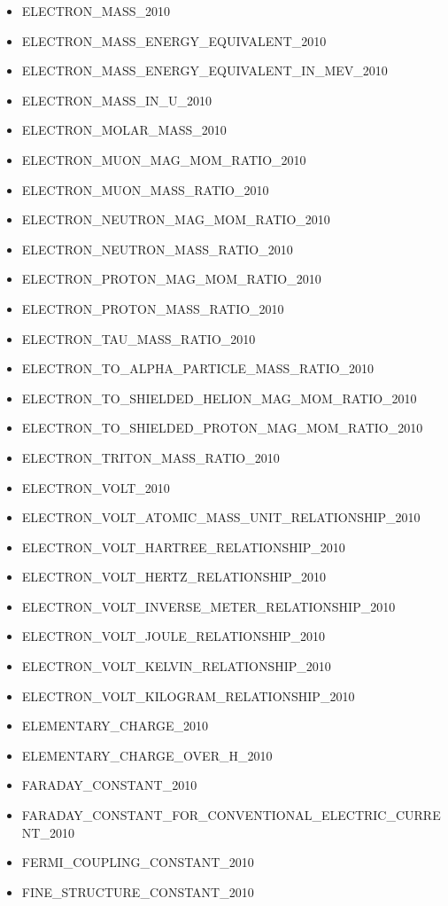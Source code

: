 \begin{itemize}
\item
  ELECTRON\_MASS\_2010
\item
  ELECTRON\_MASS\_ENERGY\_EQUIVALENT\_2010
\item
  ELECTRON\_MASS\_ENERGY\_EQUIVALENT\_IN\_MEV\_2010
\item
  ELECTRON\_MASS\_IN\_U\_2010
\item
  ELECTRON\_MOLAR\_MASS\_2010
\item
  ELECTRON\_MUON\_MAG\_MOM\_RATIO\_2010
\item
  ELECTRON\_MUON\_MASS\_RATIO\_2010
\item
  ELECTRON\_NEUTRON\_MAG\_MOM\_RATIO\_2010
\item
  ELECTRON\_NEUTRON\_MASS\_RATIO\_2010
\item
  ELECTRON\_PROTON\_MAG\_MOM\_RATIO\_2010
\item
  ELECTRON\_PROTON\_MASS\_RATIO\_2010
\item
  ELECTRON\_TAU\_MASS\_RATIO\_2010
\item
  ELECTRON\_TO\_ALPHA\_PARTICLE\_MASS\_RATIO\_2010
\item
  ELECTRON\_TO\_SHIELDED\_HELION\_MAG\_MOM\_RATIO\_2010
\item
  ELECTRON\_TO\_SHIELDED\_PROTON\_MAG\_MOM\_RATIO\_2010
\item
  ELECTRON\_TRITON\_MASS\_RATIO\_2010
\item
  ELECTRON\_VOLT\_2010
\item
  ELECTRON\_VOLT\_ATOMIC\_MASS\_UNIT\_RELATIONSHIP\_2010
\item
  ELECTRON\_VOLT\_HARTREE\_RELATIONSHIP\_2010
\item
  ELECTRON\_VOLT\_HERTZ\_RELATIONSHIP\_2010
\item
  ELECTRON\_VOLT\_INVERSE\_METER\_RELATIONSHIP\_2010
\item
  ELECTRON\_VOLT\_JOULE\_RELATIONSHIP\_2010
\item
  ELECTRON\_VOLT\_KELVIN\_RELATIONSHIP\_2010
\item
  ELECTRON\_VOLT\_KILOGRAM\_RELATIONSHIP\_2010
\item
  ELEMENTARY\_CHARGE\_2010
\item
  ELEMENTARY\_CHARGE\_OVER\_H\_2010
\item
  FARADAY\_CONSTANT\_2010
\item
  FARADAY\_CONSTANT\_FOR\_CONVENTIONAL\_ELECTRIC\_CURRENT\_2010
\item
  FERMI\_COUPLING\_CONSTANT\_2010
\item
  FINE\_STRUCTURE\_CONSTANT\_2010

\end{itemize}
